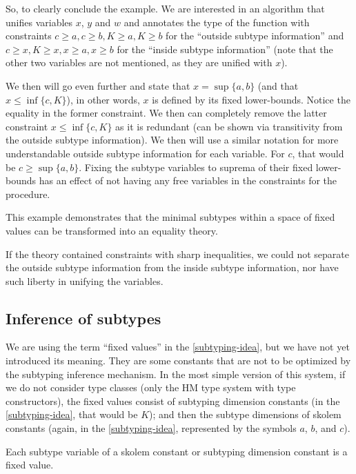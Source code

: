 So, to clearly conclude the example. We are interested in an algorithm that unifies variables $x$, $y$ and $w$ and annotates the type of the function with constraints $c \geq a, c \geq b, K \geq a, K \geq b$ for the ``outside subtype information'' and $c \geq x, K \geq x, x \geq a, x \geq b$ for the ``inside subtype information'' (note that the other two variables are not mentioned, as they are unified with $x$).

We then will go even further and state that $x = \sup \{a, b\}$ (and that $x \leq \inf \{c, K\}$), in other words, $x$ is defined by its fixed lower-bounds. Notice the equality in the former constraint. We then can completely remove the latter constraint $x \leq \inf \{c, K\}$ as it is redundant (can be shown via transitivity from the outside subtype information).  We then will use a similar notation for more understandable outside subtype information for each variable. For $c$, that would be $c \geq \sup \{a, b\}$. Fixing the subtype variables to suprema of their fixed lower-bounds has an effect of not having any free variables in the constraints for the procedure.

This example demonstrates that the minimal subtypes within a space of fixed values can be transformed into an equality theory.

\begin{remark}
    If the theory contained constraints with sharp inequalities, we could not separate the outside subtype information from the inside subtype information, nor have such liberty in unifying the variables.
\end{remark}

\subsection{Inference of subtypes}

We are using the term ``fixed values'' in the \cref{subtyping-idea}, but we have not yet introduced its meaning. They are some constants that are not to be optimized by the subtyping inference mechanism. In the most simple version of this system, if we do not consider type classes (only the HM type system with type constructors), the fixed values consist of subtyping dimension constants (in the \cref{subtyping-idea}, that would be $K$); and then the subtype dimensions of skolem constants (again, in the \cref{subtyping-idea}, represented by the symbols $a$, $b$, and $c$).

\begin{defn}
    Each subtype variable of a skolem constant or subtyping dimension constant is a fixed value.
\end{defn}

